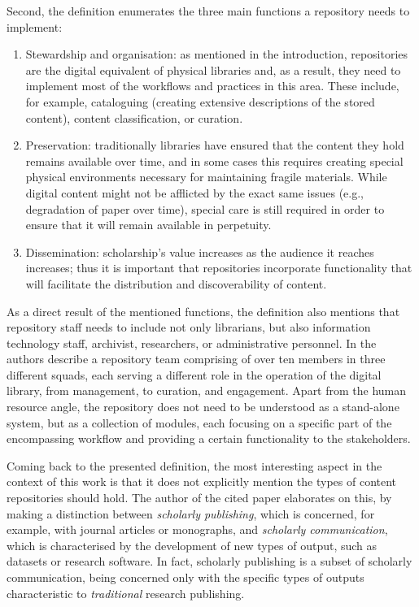 Second, the definition enumerates the three main functions a repository needs to implement:
\begin{enumerate}
    \item Stewardship and organisation: as mentioned in the introduction, repositories are the digital equivalent of physical libraries and, as a result, they need to implement most of the workflows and practices in this area. These include, for example, cataloguing (creating extensive descriptions of the stored content), content classification, or curation.
    \item Preservation: traditionally libraries have ensured that the content they hold remains available over time, and in some cases this requires creating special physical environments necessary for maintaining fragile materials. While digital content might not be afflicted by the exact same issues (e.g., degradation of paper over time), special care is still required in order to ensure that it will remain available in perpetuity. 
    \item Dissemination: scholarship's value increases as the audience it reaches increases; thus it is important that repositories incorporate functionality that will facilitate the distribution and discoverability of content.
\end{enumerate}

As a direct result of the mentioned functions, the definition also mentions that repository staff needs to include not only librarians, but also information technology staff, archivist, researchers, or administrative personnel. In \cite{cmu} the authors describe a repository team comprising of over ten members in three different squads, each serving a different role in the operation of the digital library, from management, to curation, and engagement. Apart from the human resource angle, the repository does not need to be understood as a stand-alone system, but as a collection of modules, each focusing on a specific part of the encompassing workflow and providing a certain functionality to the stakeholders.

Coming back to the presented definition, the most interesting aspect in the context of this work is that it does not explicitly mention the types of content repositories should hold. The author of the cited paper elaborates on this, by making a distinction between \emph{scholarly publishing}, which is concerned, for example, with journal articles or monographs, and \emph{scholarly communication}, which is characterised by the development of new types of output, such as datasets or research software. In fact, scholarly publishing is a subset of scholarly communication, being concerned only with the specific types of outputs characteristic to \emph{traditional} research publishing.

